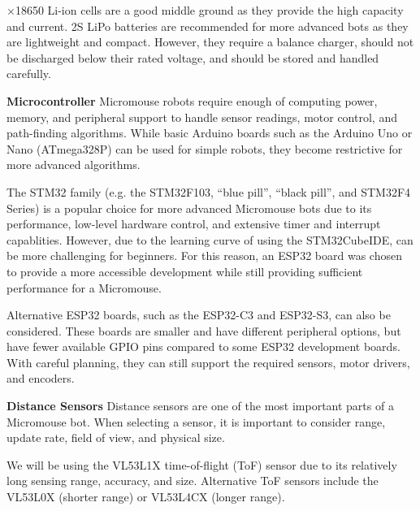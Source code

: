 \documentclass[11pt]{report}
\begin{document}
	×18650 Li-ion cells are a good middle ground as they provide the high capacity and current. 2S LiPo 
	batteries are recommended for more advanced bots as they are lightweight and compact. However, they require 
	a balance charger, should not be discharged below their rated voltage, and should be stored and handled carefully.
	\newline

	\noindent
	\textbf{Microcontroller}
	\newline
	Micromouse robots require enough of computing power, memory, and peripheral support to handle 
	sensor readings, motor control, and path-finding algorithms. While basic Arduino boards such as the  
	Arduino Uno or Nano (ATmega328P) can be used for simple robots, they become restrictive for more advanced
	algorithms.
	\newline

	\noindent
	The STM32 family (e.g. the STM32F103, ``blue pill'', ``black pill'', and STM32F4 Series) is a popular choice for 
	more advanced Micromouse bots due to its performance, low-level hardware control, and extensive timer and 
	interrupt capablities. However, due to the learning curve of using the STM32CubeIDE, can be more challenging
	for beginners. For this reason, an ESP32 board was chosen to provide a more accessible development while 
	still providing sufficient performance for a Micromouse.
	\newline

	\noindent
	Alternative ESP32 boards, such as the ESP32-C3 and ESP32-S3, can also be considered. These boards 
	are smaller and have different peripheral options, but have fewer available GPIO pins compared 
	to some ESP32 development boards. With careful planning, they can still support the required 
	sensors, motor drivers, and encoders.
	\newline

	\newpage

	\noindent
	\textbf{Distance Sensors}
	\newline
	Distance sensors are one of the most important parts of a Micromouse bot. When selecting a sensor,
	it is important to consider range, update rate, field of view, and physical size. 
	\newline
	
	\noindent
	We will be using the VL53L1X time-of-flight (ToF) sensor due to its relatively long sensing range,
	accuracy, and size. Alternative ToF sensors include the VL53L0X (shorter range) or VL53L4CX
	(longer range). 
	\newline
\end{document}
